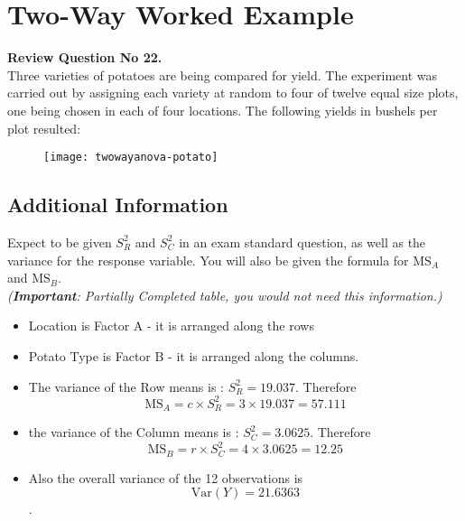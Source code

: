 	
\section*{Two-Way Worked Example}

\noindent\textbf{Review Question No 22.} \\

\noindent Three varieties of potatoes are being compared for yield. The experiment
was carried out by assigning each variety at random to four of twelve equal size
plots, one being chosen in each of four locations. The following yields in bushels per 
plot resulted:

\begin{figure}[h!]
	\centering
	\texttt{[image: twowayanova-potato]}
\end{figure}
\subsection*{Additional Information} 
\begin{framed}
	\noindent Expect to be given $S^2_R$ and $S^2_C$ in an exam standard question, as well as the variance for the response variable. You will also be given the formula for $\textrm{MS}_{A}$ and $\textrm{MS}_{B}$.\\
	\textit{(\textbf{Important}: Partially Completed table, you would not need this information.)}
\end{framed}

\begin{itemize}
	\item Location is Factor A - it is arranged along the rows
	\item Potato Type is Factor B - it is arranged along the columns.
\end{itemize}
\begin{itemize}
	\item The variance of the Row means is : $S^2_{R} = 19.037$. Therefore 
	\[ \textrm{MS}_{A} = c \times S^2_{R} = 3 \times 19.037 = 57.111 \]
	
	\item the variance of the Column means is : $S^2_{C} = 3.0625$.	Therefore 
	\[ \textrm{MS}_{B} = r \times S^2_{C} = 4 \times 3.0625 = 12.25\]
	
	\item Also the overall variance of the 12 observations is \[\textrm{Var}(Y) = 21.6363 \]. 
\end{itemize}

